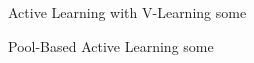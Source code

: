 \documentclass[aspectratio=169, 11pt, invertlogo]{ismll-slides}
\begin{document}

\begin{frame}[fragile]{Active Learning with V-Learning}
some
\end{frame}




\begin{frame}[fragile]{Pool-Based Active Learning}
	some
\end{frame}



\appendix


%
%




\begin{frame}[allowframebreaks]%
%
%
\end{frame}

\end{document}
